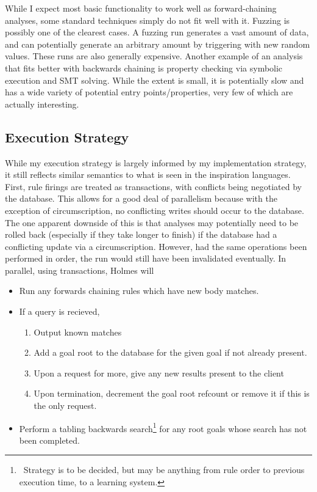 While I expect most basic functionality to work well as forward-chaining analyses, some standard techniques simply do not fit well with it.
Fuzzing is possibly one of the clearest cases.
A fuzzing run generates a vast amount of data, and can potentially generate an arbitrary amount by triggering with new random values.
These runs are also generally expensive.
Another example of an analysis that fits better with backwards chaining is property checking via symbolic execution and SMT solving.
While the extent is small, it is potentially slow and has a wide variety of potential entry points/properties, very few of which are actually interesting.
\subsection{Execution Strategy}
While my execution strategy is largely informed by my implementation strategy, it still reflects similar semantics to what is seen in the inspiration languages.
First, rule firings are treated as transactions, with conflicts being negotiated by the database.
This allows for a good deal of parallelism because with the exception of circumscription, no conflicting writes should occur to the database.
The one apparent downside of this is that analyses may potentially need to be rolled back (especially if they take longer to finish) if the database had a conflicting update via a circumscription.
However, had the same operations been performed in order, the run would still have been invalidated eventually.
In parallel, using transactions, Holmes will
\begin{itemize}
\item Run any forwards chaining rules which have new body matches.
\item If a query is recieved,
        \begin{enumerate}
                \item Output known matches
                \item Add a goal root to the database for the given goal if not already present.
                \item Upon a request for more, give any new results present to the client
                \item Upon termination, decrement the goal root refcount or remove it if this is the only request.
        \end{enumerate}
\item Perform a tabling backwards search\footnote{\
                Strategy is to be decided, but may be anything from rule order to previous execution time, to a learning system.
        } for any root goals whose search has not been completed.
\end{itemize}

